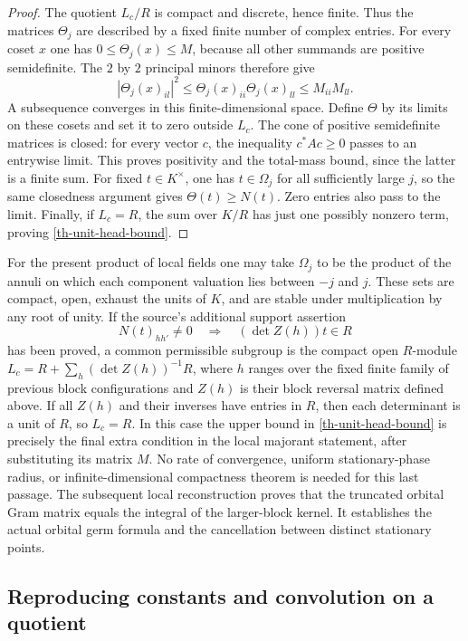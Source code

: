 \begin{proof}
The quotient $L_c/R$ is compact and discrete, hence finite.  Thus
the matrices $\Theta_j$ are described by a fixed finite number of
complex entries.  For every coset $x$ one has
$0\le\Theta_j(x)\le M$, because all other summands are positive
semidefinite.  The $2$ by $2$ principal minors therefore give
\[
 |\Theta_j(x)_{il}|^2
 \le\Theta_j(x)_{ii}\Theta_j(x)_{ll}
 \le M_{ii}M_{ll}.
\]
A subsequence converges in this finite-dimensional space.  Define
$\Theta$ by its limits on these cosets and set it to zero outside
$L_c$.  The cone of positive semidefinite matrices is closed:
for every vector $c$, the inequality $c^*Ac\ge0$ passes to an
entrywise limit.  This proves positivity and the total-mass bound,
since the latter is a finite sum.  For fixed $t\in K^\times$,
one has $t\in\Omega_j$ for all sufficiently large $j$, so the
same closedness argument gives $\Theta(t)\ge N(t)$.
Zero entries also pass to the limit.  Finally, if $L_c=R$, the
sum over $K/R$ has just one possibly nonzero term, proving
\eqref{th-unit-head-bound}.
\end{proof}

For the present product of local fields one may take $\Omega_j$ to
be the product of the annuli on which each component valuation lies
between $-j$ and $j$.  These sets are compact, open, exhaust the
units of $K$, and are stable under multiplication by any root of
unity.  If the source's additional support assertion
\[
 N(t)_{hh'}\ne0\quad\Longrightarrow\quad
       (\det Z(h))t\in R
\]
has been proved, a common permissible subgroup is the compact open
$R$-module
$L_c=R+\sum_h(\det Z(h))^{-1}R$, where $h$ ranges over the fixed
finite family of previous block configurations and $Z(h)$ is their
block reversal matrix defined above.  If all $Z(h)$ and their inverses have
entries in $R$, then each determinant is a unit of $R$, so
$L_c=R$.  In this case the upper bound in
\eqref{th-unit-head-bound} is precisely the final extra condition
in the local majorant statement, after substituting its matrix
$M$.  No rate of convergence, uniform stationary-phase radius,
or infinite-dimensional compactness theorem is needed for this
last passage.  The subsequent local reconstruction proves that
the truncated orbital Gram matrix equals the integral of the
larger-block kernel.  It establishes the actual orbital germ
formula and the cancellation between distinct stationary points.

\subsection{Reproducing constants and convolution on a quotient}

